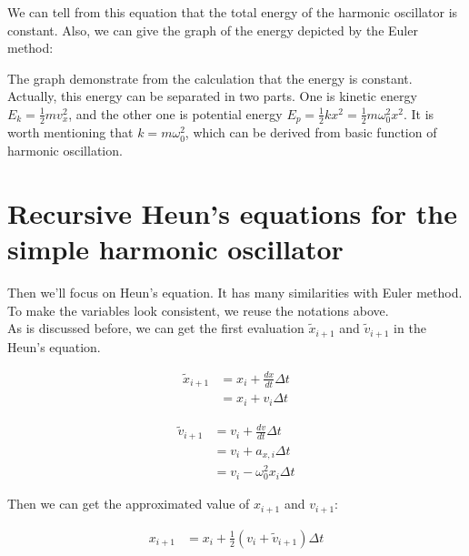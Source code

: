 \documentclass[12pt]{article}
\begin{document}
We can tell from this equation that the total energy of the harmonic oscillator is constant. Also, we can give the graph of the energy depicted by the Euler method: 



The graph demonstrate from the calculation that the energy is constant. Actually, this energy can be separated in two parts. One is kinetic energy $E_k = \frac{1}{2}mv_x^2$, and the other one is potential energy $E_p = \frac{1}{2} k x^2 = \frac{1}{2} m \omega_0^2 x^2$. It is worth mentioning that $k = m \omega_0^2$, which can be derived from basic function of harmonic oscillation. 



\section{Recursive Heun's equations for the simple harmonic
oscillator}

Then we'll focus on Heun's equation. It has many similarities with Euler method. To make the variables look consistent, we reuse the notations above. \\

As is discussed before, we can get the first evaluation $\tilde{x}_{i+1}$ and $\tilde{v}_{i+1}$ in the Heun's equation. 

\begin{align}
    \tilde{x}_{i+1}  &= x_{i} + \frac{dx}{dt} \Delta t \\
                     &= x_{i} + v_{i} \Delta t \nonumber 
\end{align}

\begin{align}
    \tilde{v}_{i+1} &= v_{i} + \frac{dv}{dt} \Delta t \\
                    &= v_{i} + a_{x,i} \Delta t \nonumber \\
                    &= v_{i} - \omega_{0}^2 x_{i} \Delta t \nonumber 
\end{align}

Then we can get the approximated value of $x_{i+1}$ and $v_{i+1}$: 

\begin{align}
    x_{i+1} &= x_{i} + \frac{1}{2} (v_{i} + \tilde{v}_{i+1}) \Delta t
\end{align}
\end{document}
